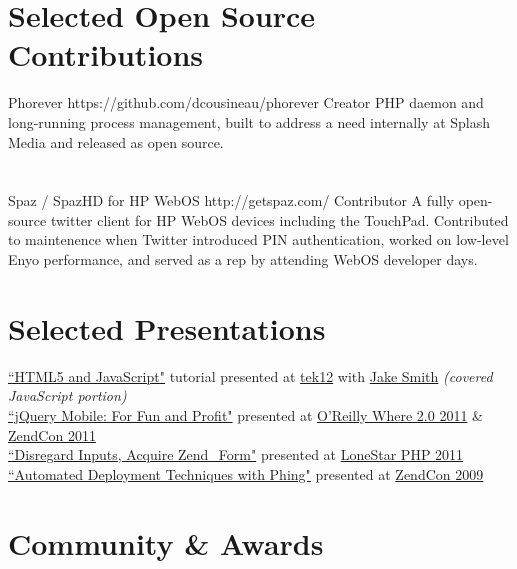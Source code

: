 \documentclass{resume}
\begin{document}
\section{Selected Open Source Contributions}

\project
	{Phorever}
	{https://github.com/dcousineau/phorever}
	{Creator}
	{PHP daemon and long-running process management, built to address a need internally at Splash Media and released as open source.}
\\ \\ \\
\project
	{Spaz / SpazHD for HP WebOS}
	{http://getspaz.com/}
	{Contributor}
	{A fully open-source twitter client for HP WebOS devices including the TouchPad. Contributed to maintenence when Twitter introduced PIN authentication, worked on low-level Enyo performance, and served as a rep by attending WebOS developer days.}

\section{Selected Presentations}

\begin{spacing}{1.25}
\href{https://speakerdeck.com/u/dcousineau/p/html5-and-javascript-part-deux-javascript}{``HTML5 and JavaScript"} tutorial presented at \href{http://tek12.phparch.com/talks/#HTML5-and-Javascript-for-the-PHP-Developer}{tek12} with \href{http://jakefolio.com/}{Jake Smith} \emph{(covered JavaScript portion)}
\\
\href{http://www.slideshare.net/eljefe/jquery-mobile-for-fun-and-profit}{``jQuery Mobile: For Fun and Profit"} presented at \href{http://whereconf.com/where2011/public/schedule/speaker/110352}{O'Reilly Where 2.0 2011} \& \href{http://zendcon.com/2011/speaker/#4054}{ZendCon 2011}
\\
\href{http://www.slideshare.net/eljefe/disregard-inputs-acquire-zendform}{``Disregard Inputs, Acquire Zend\_Form"} presented at \href{http://lonestarphp.com/}{LoneStar PHP 2011}
\\
\href{http://www.slideshare.net/eljefe/automated-deployment-with-phing}{``Automated Deployment Techniques with Phing"} presented at \href{http://zendcon.com/2009/speakers#4054}{ZendCon 2009}
\end{spacing}

\section{Community \& Awards}
\end{document}
